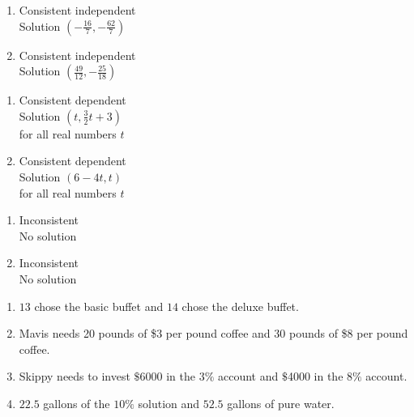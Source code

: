 \begin{multicols}{2}
\begin{enumerate}
\setcounter{enumi}{\value{HW}}

\item  Consistent independent \\
Solution $\left(-\frac{16}{7}, -\frac{62}{7}\right)$  

\item Consistent independent \\
Solution $\left(\frac{49}{12}, -\frac{25}{18}\right)$

\setcounter{HW}{\value{enumi}}
\end{enumerate}
\end{multicols}

\begin{multicols}{2}
\begin{enumerate}
\setcounter{enumi}{\value{HW}}

\item  Consistent dependent\\
Solution $\left(t, \frac{3}{2}t+3\right)$ \\
for all real numbers $t$

\item  Consistent dependent\\
Solution $\left(6-4t, t\right)$ \\
for all real numbers $t$

\setcounter{HW}{\value{enumi}}
\end{enumerate}
\end{multicols}



\begin{multicols}{2}
\begin{enumerate}
\setcounter{enumi}{\value{HW}}

\item  Inconsistent \\
No solution

\item   Inconsistent \\
No solution


\setcounter{HW}{\value{enumi}}
\end{enumerate}
\end{multicols}

\begin{enumerate}
\setcounter{enumi}{\value{HW}}

\item  $13$ chose the basic buffet and $14$ chose the deluxe buffet.

\item Mavis needs 20 pounds of \$3 per pound coffee and 30 pounds of \$8 per pound coffee.

\item  Skippy needs to invest $\$$6000 in the $3\%$ account and $\$$4000 in the $8 \%$ account.

\item  $22.5$ gallons of the $10 \%$ solution and $52.5$ gallons of pure water.

\end{enumerate}


